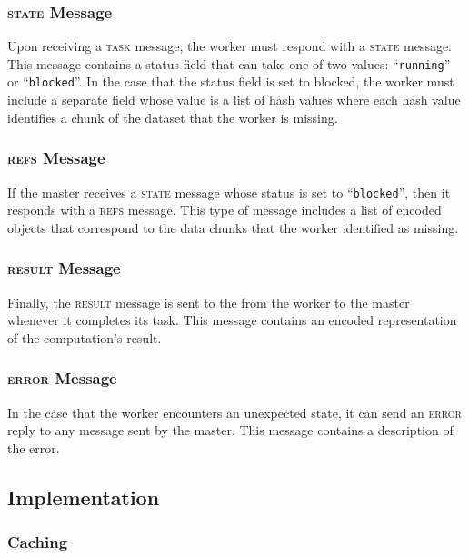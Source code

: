 \documentclass[%
  final,
  notitlepage,
  narroweqnarray,
  inline,
]{ieee}
\begin{document}
\subsubsection{\textsc{state} Message}

Upon receiving a \textsc{task} message, the worker must respond with a
\textsc{state} message. This message contains a status field that can take one
of two values: ``\texttt{running}'' or ``\texttt{blocked}''. In the case that
the status field is set to blocked, the worker must include a separate field
whose value is a list of hash values where each hash value identifies a chunk
of the dataset that the worker is missing.


\subsubsection{\textsc{refs} Message}

If the master receives a \textsc{state} message whose status is set to
``\texttt{blocked}'', then it responds with a \textsc{refs} message. This type
of message includes a list of encoded objects that correspond to the data
chunks that the worker identified as missing.


\subsubsection{\textsc{result} Message}

Finally, the \textsc{result} message is sent to the from the worker to the
master whenever it completes its task. This message contains an encoded
representation of the computation's result.


\subsubsection{\textsc{error} Message}

In the case that the worker encounters an unexpected state, it can send an
\textsc{error} reply to any message sent by the master. This message contains
a description of the error.


\subsection{Implementation}
\label{Implementation}


\subsubsection{Caching}
\end{document}
